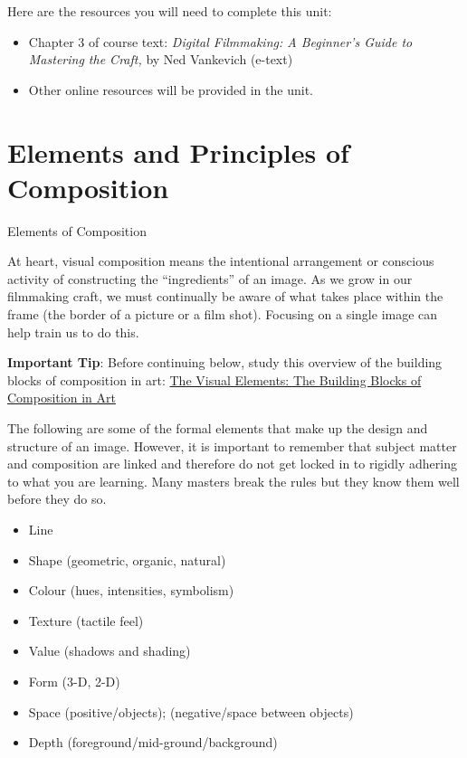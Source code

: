 \documentclass[
]{book}
\providecommand{\tightlist}{%
  \setlength{\itemsep}{0pt}\setlength{\parskip}{0pt}}
\begin{document}
Here are the resources you will need to complete this unit:

\begin{itemize}
\tightlist
\item
  Chapter 3 of course text: \emph{Digital Filmmaking: A Beginner's Guide to Mastering the Craft,} by Ned Vankevich (e-text)
\item
  Other online resources will be provided in the unit.
\end{itemize}

\hypertarget{elements-and-principles-of-composition}{%
\section{Elements and Principles of Composition}\label{elements-and-principles-of-composition}}

{Elements of Composition}

At heart, visual composition means the intentional arrangement or conscious activity of constructing the ``ingredients'' of an image. As we grow in our filmmaking craft, we must continually be aware of what takes place within the frame (the border of a picture or a film shot). Focusing on a single image can help train us to do this.

\begin{caution}
\textbf{Important Tip}: Before continuing below, study this overview of the building blocks of composition in art: \href{http://www.artyfactory.com/art_appreciation/visual-elements/visual-elements.html}{The Visual Elements: The Building Blocks of Composition in Art}
\end{caution}

The following are some of the formal elements that make up the design and structure of an image. However, it is important to remember that subject matter and composition are linked and therefore do not get locked in to rigidly adhering to what you are learning. Many masters break the rules but they know them well before they do so.

\begin{itemize}
\tightlist
\item
  Line\\
\item
  Shape (geometric, organic, natural)\\
\item
  Colour (hues, intensities, symbolism)\\
\item
  Texture (tactile feel)\\
\item
  Value (shadows and shading)\\
\item
  Form (3-D, 2-D)\\
\item
  Space (positive/objects); (negative/space between objects)\\
\item
  Depth (foreground/mid-ground/background)
\end{itemize}
\end{document}
